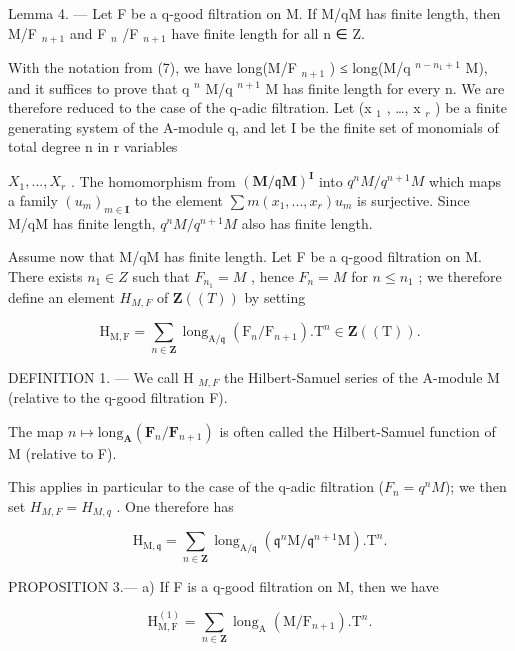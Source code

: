 Lemma 4. --- Let F be a q-good filtration on M. If M/qM has finite length, then M/F \(_{n+1}\) and F \(_{n}\) /F \(_{n+1}\) have finite length for all n ∈ Z.

With the notation from (7), we have long(M/F \(_{n+1}\) ) ≤ long(M/q \(^{n-n_1+1}\) M), and it suffices to prove that q \(^{n}\) M/q \(^{n+1}\) M has finite length for every n. We are therefore reduced to the case of the q-adic filtration. Let (x \(_{1}\) , \ldots, x \(_{r}\) ) be a finite generating system of the A-module q, and let I be the finite set of monomials of total degree n in r variables

\(X_{1},...,X_{r}\) . The homomorphism from \((\mathbf{M}/\mathfrak{q}\mathbf{M})^{\mathbf{I}}\) into \(q^{n}M/q^{n+1}M\) which maps a family \((u_{m})_{m\in\mathbf{I}}\) to the element \(\sum m(x_{1},...,x_{r})u_{m}\) is surjective. Since M/qM has finite length, \(q^{n}M/q^{n+1}M\) also has finite length.

Assume now that M/qM has finite length. Let F be a q-good filtration on M. There exists \(n_{1} \in Z\) such that \(F_{n_{1}} = M\) , hence \(F_{n} = M\) for \(n \leqslant n_{1}\) ; we therefore define an element \(H_{M,F}\) of \(\mathbf{Z}((T))\) by setting

\[
\mathrm{H} _ {\mathrm{M}, \mathrm{F}} = \sum_ {n \in \mathbf {Z}} \operatorname{long} _ {\mathrm{A} / \mathfrak {q}} (\mathrm{F} _ {n} / \mathrm{F} _ {n + 1}). \mathrm{T} ^ {n} \in \mathbf {Z} ((\mathrm{T})) .\tag{8}
\]

DEFINITION 1. --- We call H \(_{M,F}\) the Hilbert-Samuel series of the A-module M (relative to the q-good filtration F).

The map \(n\mapsto\text{long}_{\mathbf{A}}(\mathbf{F}_{n}/\mathbf{F}_{n+1})\) is often called the Hilbert-Samuel function of M (relative to F).

This applies in particular to the case of the q-adic filtration (\(F_{n} = q^{n}M\)); we then set \(H_{M,F} = H_{M,q}\) . One therefore has

\[
\mathrm{H} _ {\mathrm{M}, \mathfrak {q}} = \sum_ {n \in \mathbf {Z}} \operatorname{long} _ {\mathrm{A} / \mathfrak {q}} (\mathfrak {q} ^ {n} \mathrm{M} / \mathfrak {q} ^ {n + 1} \mathrm{M}). \mathrm{T} ^ {n}.\tag{9}
\]

PROPOSITION 3.--- a) If F is a q-good filtration on M, then we have

\[
\mathrm{H} _ {\mathrm{M}, \mathrm{F}} ^ {(1)} = \sum_ {n \in \mathbf {Z}} \operatorname{long} _ {\mathrm{A}} (\mathrm{M} / \mathrm{F} _ {n + 1}). \mathrm{T} ^ {n}.\tag{10}
\]

